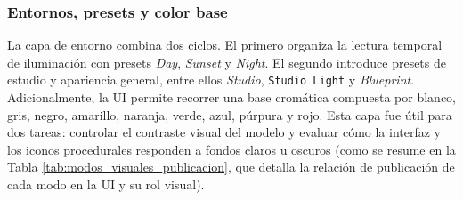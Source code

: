\subsubsection{Entornos, presets y color base}

La capa de entorno combina dos ciclos. El primero organiza la lectura temporal de iluminación con presets \textit{Day}, \textit{Sunset} y \textit{Night}. El segundo introduce presets de estudio y apariencia general, entre ellos \textit{Studio}, \texttt{Studio Light} y \textit{Blueprint}. Adicionalmente, la UI permite recorrer una base cromática compuesta por blanco, gris, negro, amarillo, naranja, verde, azul, púrpura y rojo. Esta capa fue útil para dos tareas: controlar el contraste visual del modelo y evaluar cómo la interfaz y los iconos procedurales responden a fondos claros u oscuros (como se resume en la Tabla \ref{tab:modos_visuales_publicacion}, que detalla la relación de publicación de cada modo en la UI y su rol visual).

